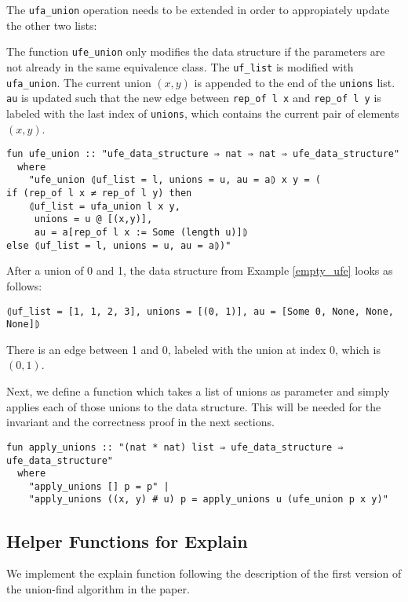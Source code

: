 The \lstinline{ufa_union} operation needs to be extended in order to appropiately update the other two lists:

The function \lstinline{ufe_union} only modifies the data structure if the parameters are not already in the same equivalence class.
The \lstinline{uf_list} is modified with \lstinline{ufa_union}.
The current union $(x, y)$ is appended to the end of the \lstinline{unions} list.
\lstinline{au} is updated such that the new edge between \lstinline{rep_of l x} and \lstinline{rep_of l y} is labeled with the last index of \lstinline{unions}, which contains the current pair of elements $(x, y)$.

\begin{lstlisting}
fun ufe_union :: "ufe_data_structure ⇒ nat ⇒ nat ⇒ ufe_data_structure"
  where
    "ufe_union ⦇uf_list = l, unions = u, au = a⦈ x y = (
if (rep_of l x ≠ rep_of l y) then
    ⦇uf_list = ufa_union l x y,
     unions = u @ [(x,y)],
     au = a[rep_of l x := Some (length u)]⦈
else ⦇uf_list = l, unions = u, au = a⦈)"
\end{lstlisting}

\begin{exmp}
After a union of 0 and 1, the data structure from Example \ref{empty_ufe} looks as follows:
\begin{lstlisting}
⦇uf_list = [1, 1, 2, 3], unions = [(0, 1)], au = [Some 0, None, None, None]⦈
\end{lstlisting}
There is an edge between 1 and 0, labeled with the union at index 0, which is $(0,1)$.
\end{exmp}

Next, we define a function which takes a list of unions as parameter and simply applies each of those unions to the data structure. This will be needed for the invariant and the correctness proof in the next sections.

\begin{lstlisting}
fun apply_unions :: "(nat * nat) list ⇒ ufe_data_structure ⇒ ufe_data_structure"
  where
    "apply_unions [] p = p" |
    "apply_unions ((x, y) # u) p = apply_unions u (ufe_union p x y)"
\end{lstlisting}

\subsection{Helper Functions for Explain}

We implement the explain function following the description of the first version of the union-find algorithm in the paper\cite{Nieuwenhuis}.

